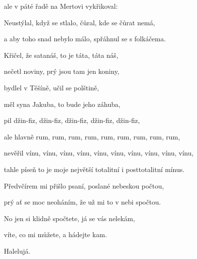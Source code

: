 ale v páté řadě na Mertovi vykřikoval: 

Neustýlal, když se stlalo, čůral, kde se čůrat nemá,

a aby toho snad nebylo málo, spřáhnul se s folkáčema.

Křičel, že satanáš, to je táta, táta náš,

nečetl noviny, prý jsou tam jen koniny,

bydlel v Těšíně, učil se polštině,

měl syna Jakuba, to bude jeho záhuba,

pil džin-fiz, džin-fiz, džin-fiz, džin-fiz, džin-fiz,

ale hlavně rum, rum, rum, rum, rum, rum, rum, rum, rum,

nevěřil vínu, vínu, vínu, vínu, vínu, vínu, vínu, vínu, vínu, vínu,

tahle píseň to je moje největší totalitní i posttotalitní mínus.

Předvčírem mi přišlo psaní, poslané nebeskou počtou,

prý ať se moc neoháním, že už mi to v nebi spočtou.

No jen si klidně spočtete, já se vás nelekám,

víte, co mi můžete, a hádejte kam.

Halelujá.
\ks

\zr\kr

  

\kp
